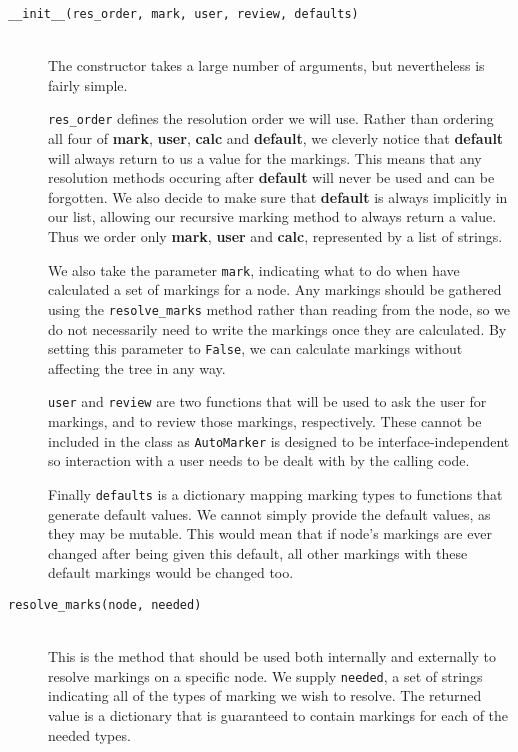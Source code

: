 \documentclass[twoside,a4paper]{report}
\begin{document}
\begin{description}
\item[\texttt{\_\_init\_\_(res\_order, mark, user, review, defaults)}] \hfill \\
The constructor takes a large number of arguments, but nevertheless is fairly simple.

\texttt{res\_order} defines the resolution order we will use. Rather than ordering all four of \textbf{mark}, \textbf{user}, \textbf{calc} and
\textbf{default}, we cleverly notice that \textbf{default} will always return to us a value for the markings. This means that any resolution methods
occuring after \textbf{default} will never be used and can be forgotten. We also decide to make sure that \textbf{default} is always implicitly in
our list, allowing our recursive marking method to always return a value. Thus we order only \textbf{mark}, \textbf{user} and \textbf{calc},
represented by a list of strings.

We also take the parameter \texttt{mark}, indicating what to do when have calculated a set of markings for a node. Any markings should be gathered using
the \texttt{resolve\_marks} method rather than reading from the node, so we do not necessarily need to write the markings once they are calculated. By
setting this parameter to \texttt{False}, we can calculate markings without affecting the tree in any way.

\texttt{user} and \texttt{review} are two functions that will be used to ask the user for markings, and to review those markings, respectively. These
cannot be included in the class as \texttt{AutoMarker} is designed to be interface-independent so interaction with a user needs to be dealt with by
the calling code.

Finally \texttt{defaults} is a dictionary mapping marking types to functions that generate default values. We cannot simply provide the default values,
as they may be mutable. This would mean that if node's markings are ever changed after being given this default, all other markings with these default
markings would be changed too.

\item[\texttt{resolve\_marks(node, needed)}] \hfill \\
This is the method that should be used both internally and externally to resolve markings on a specific node. We supply \texttt{needed}, a set of strings
indicating all of the types of marking we wish to resolve. The returned value is a dictionary that is guaranteed to contain markings for each of the
needed types.


\end{description}
\end{document}
